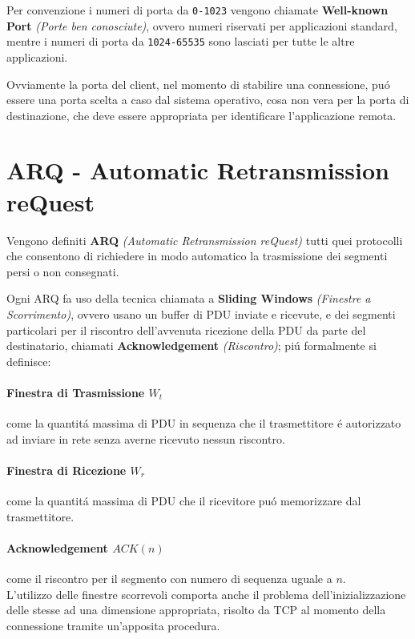 \documentclass[12pt]{article}
\def\code#1{\texttt{#1}}
\begin{document}
Per convenzione i numeri di porta da \code{0-1023} vengono chiamate \textbf{Well-known Port} \textit{(Porte ben 
conosciute)}, ovvero numeri riservati per applicazioni standard, mentre i numeri di porta da \code{1024-65535} sono 
lasciati per tutte le altre applicazioni.

Ovviamente la porta del client, nel momento di stabilire una connessione, pu\'o essere una porta scelta a caso dal 
sistema operativo, cosa non vera per la porta di destinazione, che deve essere appropriata per identificare 
l'applicazione remota.



\clearpage
\section{ARQ - Automatic Retransmission reQuest}\label{arq}
Vengono definiti \textbf{ARQ} \textit{(Automatic Retransmission reQuest)} tutti quei protocolli che consentono di 
richiedere in modo automatico la trasmissione dei segmenti persi o non consegnati.

Ogni ARQ fa uso della tecnica chiamata a \textbf{Sliding Windows} \textit{(Finestre a Scorrimento)}, ovvero usano un 
buffer di PDU inviate e ricevute, e dei segmenti particolari per il riscontro dell'avvenuta ricezione della PDU da 
parte del destinatario, chiamati \textbf{Acknowledgement} \textit{(Riscontro)}; pi\'u formalmente si definisce:

\paragraph{Finestra di Trasmissione $W_t$} come la quantit\'a massima di PDU in sequenza che il trasmettitore \'e 
autorizzato ad inviare in rete senza averne ricevuto nessun riscontro.
	
\paragraph{Finestra di Ricezione $W_r$} come la quantit\'a massima di PDU che il ricevitore pu\'o memorizzare dal 
trasmettitore.

\paragraph{Acknowledgement $ACK(n)$} come il riscontro per il segmento con numero di sequenza uguale a $n$.\\

L'utilizzo delle finestre scorrevoli comporta anche il problema dell'inizializzazione delle stesse ad una dimensione 
appropriata, risolto da TCP al momento della connessione tramite un'apposita procedura.
\end{document}
